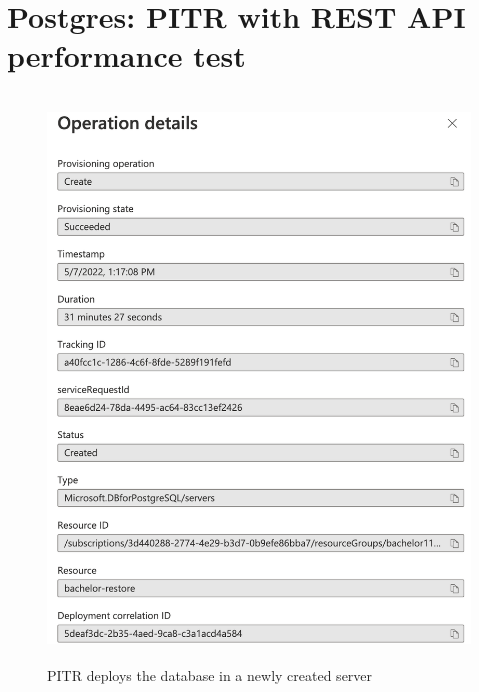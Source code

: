 \section{Postgres: PITR with REST API performance test}
\label{app:pg-restore2}

\begin{figure}[H]
    \centering
    \includegraphics[width=\textwidth, height=15cm]{figures/postgres/PITR-restore.PNG}
    \caption{PITR deploys the database in a newly created server}
    \label{fig:my_label}
\end{figure}